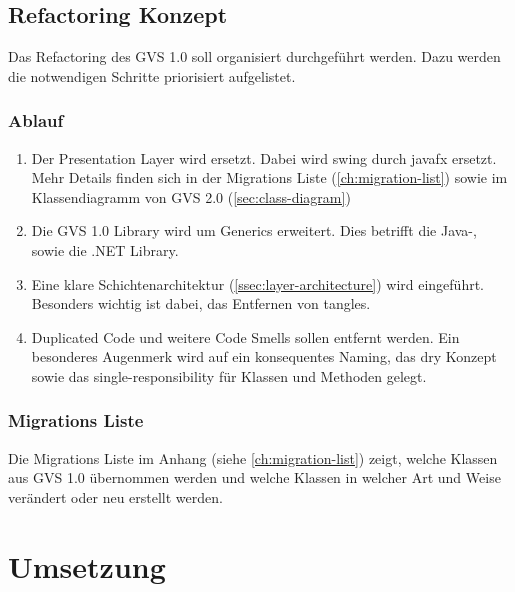 \documentclass[11pt,a4paper,english,oneside]{book}
\numberwithin{equation}{chapter}
\begin{document}
	\section{Refactoring Konzept} \label{sec:refactoring-concept}
	Das Refactoring des GVS 1.0 soll organisiert durchgeführt werden. Dazu werden die notwendigen Schritte priorisiert aufgelistet.
		
	\subsection{Ablauf}\label{ssec:ablauf}
	\begin{enumerate}
		\item Der Presentation Layer wird ersetzt. Dabei wird \gls{swing} durch \gls{javafx} ersetzt. Mehr Details finden sich in der Migrations Liste (\ref{ch:migration-list}) sowie im Klassendiagramm von GVS 2.0 (\ref{sec:class-diagram})
		\item Die GVS 1.0 Library wird um Generics erweitert. Dies betrifft die Java-, sowie die .NET Library.
		\item Eine klare Schichtenarchitektur (\ref{ssec:layer-architecture}) wird eingeführt. Besonders wichtig ist dabei, das Entfernen von \glspl{tangle}.
		\item Duplicated Code und weitere Code Smells sollen entfernt werden. Ein besonderes Augenmerk wird auf ein konsequentes Naming, das \gls{dry} Konzept sowie das \gls{single-responsibility} für Klassen und Methoden gelegt.
	\end{enumerate}

	\subsection{Migrations Liste}
	\label{ssec:class-refactroing-list}
	Die Migrations Liste im Anhang (siehe \ref{ch:migration-list}) zeigt, welche Klassen aus GVS 1.0 übernommen werden und welche Klassen in welcher Art und Weise verändert oder neu erstellt werden.

	
	\chapter{Umsetzung} \label{ch:umsetzung}
		
\end{document}
